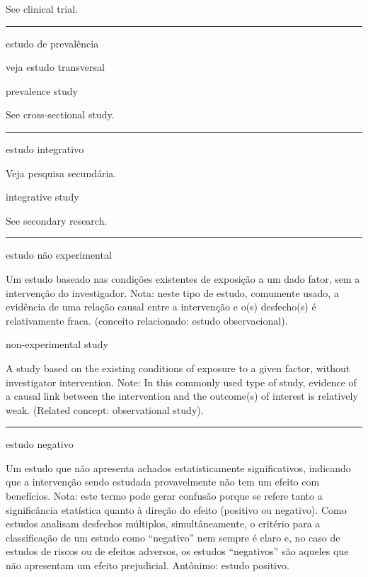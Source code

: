 \documentclass[
  openany]{book}
\begin{document}
See clinical trial.

\begin{center}\rule{0.5\linewidth}{0.5pt}\end{center}

estudo de prevalência

veja estudo transversal

prevalence study

See cross-sectional study.

\begin{center}\rule{0.5\linewidth}{0.5pt}\end{center}

estudo integrativo

Veja pesquisa secundária.

integrative study

See secondary research.

\begin{center}\rule{0.5\linewidth}{0.5pt}\end{center}

estudo não experimental

Um estudo baseado nas condições existentes de exposição a um dado fator, sem a intervenção do investigador. Nota: neste tipo de estudo, comumente usado, a evidência de uma relação causal entre a intervenção e o(s) desfecho(s) é relativamente fraca. (conceito relacionado: estudo observacional).

non-experimental study

A study based on the existing conditions of exposure to a given factor, without investigator intervention. Note: In this commonly used type of study, evidence of a causal link between the intervention and the outcome(s) of interest is relatively weak. (Related concept: observational study).

\begin{center}\rule{0.5\linewidth}{0.5pt}\end{center}

estudo negativo

Um estudo que não apresenta achados estatisticamente significativos, indicando que a intervenção sendo estudada provavelmente não tem um efeito com benefícios. Nota: este termo pode gerar confusão porque se refere tanto a significância etatística quanto à direção do efeito (positivo ou negativo). Como estudos analisam desfechos múltiplos, simultâneamente, o critério para a classificação de um estudo como ``negativo'' nem sempre é claro e, no caso de estudos de riscos ou de efeitos adversos, os estudos ``negativos'' são aqueles que não apresentam um efeito prejudicial. Antônimo: estudo positivo.
\end{document}
